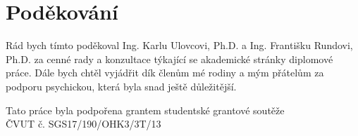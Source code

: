 \chapter*{Poděkování}
\label{chap:acknowledgement}

Rád bych tímto poděkoval Ing. Karlu Ulovcovi, Ph.D. a Ing. Františku Rundovi, Ph.D. za cenné rady a konzultace týkající se akademické stránky diplomové práce. Dále bych chtěl vyjádřit dík členům mé rodiny a mým přátelům za podporu psychickou, která byla snad ještě důležitější.

\vfill

\null\hfill Tato práce byla podpořena grantem studentské grantové soutěže \\ \null\hfill ČVUT č. SGS17/190/OHK3/3T/13



